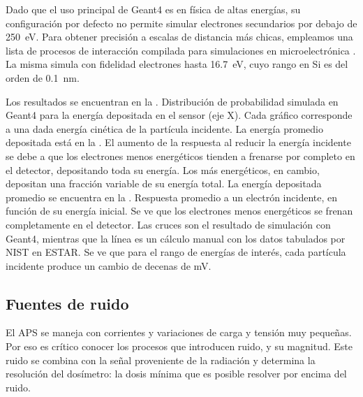 Dado que el uso principal de Geant4 es en física de altas energías,
su configuración por defecto no permite simular electrones secundarios por
debajo de \SI{250}{\electronvolt}.
Para obtener precisión a escalas de distancia más chicas,
empleamos una lista de procesos de interacción 
compilada para simulaciones en microelectrónica \cite{Raine201497}.
La misma simula con fidelidad electrones hasta \SI{16.7}{\electronvolt},
cuyo rango en Si es del orden de \SI{0.1}{\nano\meter}.

Los resultados se encuentran en la .
{Distribución de probabilidad simulada en Geant4 
    para la energía depositada en el sensor (eje X).
Cada gráfico corresponde a una dada energía cinética de la partícula incidente.
La energía promedio depositada está en la .}
El aumento de la respuesta al reducir la energía incidente se debe a que 
los electrones menos energéticos 
tienden a frenarse por completo en el detector,
depositando toda su energía.
Los más energéticos, en cambio, depositan una fracción variable de su energía
total.
La energía depositada promedio se encuentra en la
.
{Respuesta promedio a un electrón incidente,
en función de su energía inicial.
Se ve que los electrones menos energéticos se frenan completamente en el
detector.
Las cruces son el resultado de simulación con Geant4,
mientras que la línea es un cálculo manual 
con los datos tabulados por NIST en ESTAR\cite{berger_estar_????}.}
Se ve que para el rango de energías de interés,
cada partícula incidente produce un cambio de decenas de mV.
\subsection{Fuentes de ruido}
El APS se maneja con corrientes y variaciones de carga y tensión muy
pequeñas.
Por eso es crítico conocer los procesos que introducen ruido, 
y su magnitud.
Este ruido se combina con la señal proveniente de la radiación
y determina la resolución del dosímetro: 
la dosis mínima que es posible resolver por encima del
ruido\cite{taylor_introduction_1997}.
